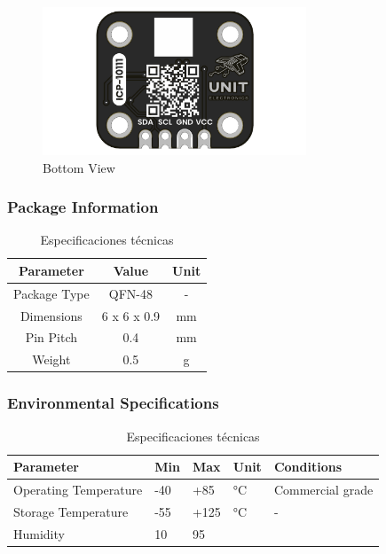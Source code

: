 \documentclass[11pt,a4paper]{article}
\begin{document}
\begin{figure}[H]
\centering
\includegraphics[width=0.7\textwidth]{en_unit_btm_v_1_0_0_icp10111_barometric_pressure_sensor.png}
\caption{Bottom View}
\label{fig:en-unit-btm-v-1-0-0-icp10111-barometric-pressure-sensor-png}
\end{figure}



\subsubsection{Package Information}


\begin{table}[H]
\centering
\small
\begin{tabular}{|c|c|c|}
\hline
Parameter & Value & Unit \\
\hline
Package Type & QFN-48 & - \\
Dimensions & 6 x 6 x 0.9 & mm \\
Pin Pitch & 0.4 & mm \\
Weight & 0.5 & g \\
\hline
\end{tabular}
\caption{Especificaciones técnicas}
\end{table}


\subsubsection{Environmental Specifications}


\begin{table}[H]
\centering
\small
\begin{tabular}{|l|l|l|l|l|}
\hline
Parameter & Min & Max & Unit & Conditions \\
\hline
Operating Temperature & -40 & +85 & °C & Commercial grade \\
Storage Temperature & -55 & +125 & °C & - \\
Humidity & 10 & 95 & %
\hline
\end{tabular}
\caption{Especificaciones técnicas}
\end{table}
\end{document}
